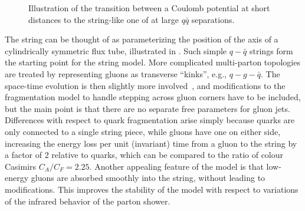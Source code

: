 \begin{figure}[t]
\centering
\caption{Illustration of the transition between a Coulomb potential
  at short distances to the string-like one of  at
  large $q\bar{q}$ separations.\label{fig:string}}
\end{figure}

The string can be thought of as 
parameterizing the position of the axis of 
a cylindrically symmetric flux tube, illustrated in 
. Such simple $q-\bar{q}$ strings form the starting
point for the string model. 
%
More complicated multi-parton topologies
are treated by  
representing gluons as transverse ``kinks'', e.g., 
$q-g-\bar{q}$. The space-time evolution is then 
slightly more involved~\cite{Andersson:1998tv}, and modifications
to the fragmentation 
model to handle stepping across gluon corners have to be included,
but the main point is that there are no separate free parameters for
gluon jets. Differences with respect to 
quark  fragmentation arise simply because quarks are only
connected to a single string piece, while gluons have one on either
side, increasing the energy loss per unit (invariant) time 
from a gluon to the string by a
factor of 2 relative to quarks, which can be compared to the ratio of
colour Casimirs $C_A/C_F = 2.25$. Another appealing feature
of the model is that low-energy gluons are absorbed smoothly into the
string, without leading to modifications. This improves the stability
of the model with respect to variations of the infrared behavior of
the parton shower.

